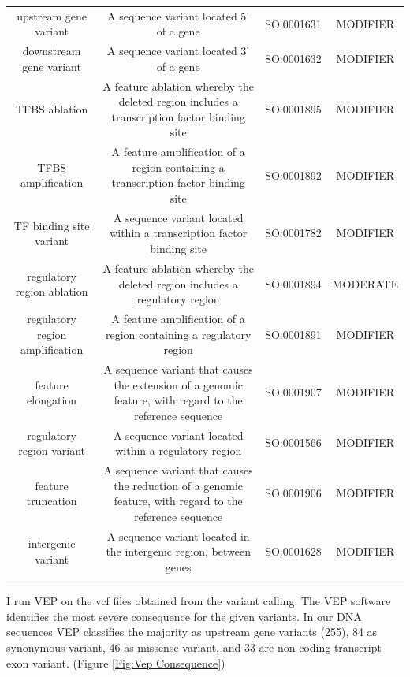 {\begin{table}
\begin{adjustbox}{width=1\textwidth}
\begin{tabular}{c c c c}
upstream gene variant & A sequence variant located 5' of a gene & SO:0001631 & MODIFIER \\
downstream gene variant & A sequence variant located 3' of a gene & SO:0001632 & MODIFIER \\
TFBS ablation & A feature ablation whereby the deleted region includes a transcription factor binding site & SO:0001895 & MODIFIER \\
TFBS amplification & A feature amplification of a region containing a transcription factor binding site & SO:0001892 & MODIFIER \\
TF binding site variant & A sequence variant located within a transcription factor binding site & SO:0001782 & MODIFIER \\
regulatory region ablation & A feature ablation whereby the deleted region includes a regulatory region & SO:0001894 & MODERATE \\
regulatory region amplification & A feature amplification of a region containing a regulatory region & SO:0001891 & MODIFIER \\
feature elongation & A sequence variant that causes the extension of a genomic feature, with regard to the reference sequence & SO:0001907 & MODIFIER \\
regulatory region variant & A sequence variant located within a regulatory region & SO:0001566 & MODIFIER \\
feature truncation & A sequence variant that causes the reduction of a genomic feature, with regard to the reference sequence & SO:0001906 & MODIFIER \\
intergenic variant & A sequence variant located in the intergenic region, between genes & SO:0001628 & MODIFIER \\
\bottomrule\\
\end{tabular}
\end{adjustbox}
\end{table}
}



I run VEP on the vcf files obtained from the variant calling. The VEP software identifies the most severe consequence for the given variants. In our DNA sequences VEP classifies the majority as upstream gene variants (255), 84 as synonymous variant, 46 as missense variant, and 33 are non coding transcript exon variant.
(Figure \ref{Fig:Vep Consequence})


